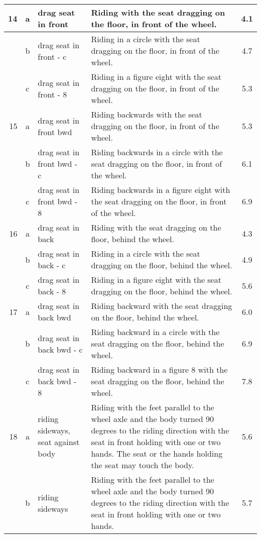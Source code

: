 \begin{longtable}{|r|c|p{4cm}|p{8cm}|c|}
\hline
14  & a & drag seat in front  & Riding with the seat dragging on the floor, in front of the wheel.  & 4.1 \\ 
\hline
  & b & drag seat in front - c  & Riding in a circle with the seat dragging on the floor, in front of the wheel.  & 4.7 \\ 
\hline
  & c & drag seat in front - 8  & Riding in a figure eight with the seat dragging on the floor, in front of the wheel.  & 5.3 \\ 
\hline
15  & a & drag seat in front bwd  & Riding backwards with the seat dragging on the floor, in front of the wheel.  & 5.3 \\ 
\hline
  & b & drag seat in front bwd - c  & Riding backwards in a circle with the seat dragging on the floor, in front of the wheel.  & 6.1 \\ 
\hline
  & c & drag seat in front bwd - 8  & Riding backwards in a figure eight with the seat dragging on the floor, in front of the wheel.  & 6.9 \\ 
\hline
16  & a & drag seat in back & Riding with the seat dragging on the floor, behind the wheel. & 4.3 \\ 
\hline
  & b & drag seat in back - c & Riding in a circle with the seat dragging on the floor, behind the wheel. & 4.9 \\ 
\hline
  & c & drag seat in back - 8 & Riding in a figure eight with the seat dragging on the floor, behind the wheel. & 5.6 \\ 
\hline
17  & a & drag seat in back bwd & Riding backward with the seat dragging on the floor, behind the wheel.  & 6.0 \\ 
\hline
  & b & drag seat in back bwd - c & Riding backward in a circle with the seat dragging on the floor, behind the wheel.  & 6.9 \\ 
\hline
  & c & drag seat in back bwd - 8 & Riding backward in a figure 8 with the seat dragging on the floor, behind the wheel.  & 7.8 \\ 
\hline
18  & a & riding sideways, seat against body  & Riding with the feet parallel to the wheel axle and the body turned 90 degrees to the riding direction with the seat in front holding with one or two hands. The seat or the hands holding the seat may touch the body. & 5.6 \\ 
\hline
  & b & riding sideways & Riding with the feet parallel to the wheel axle and the body turned 90 degrees to the riding direction with the seat in front holding with one or two hands.  & 5.7 \\ 

\end{longtable}
